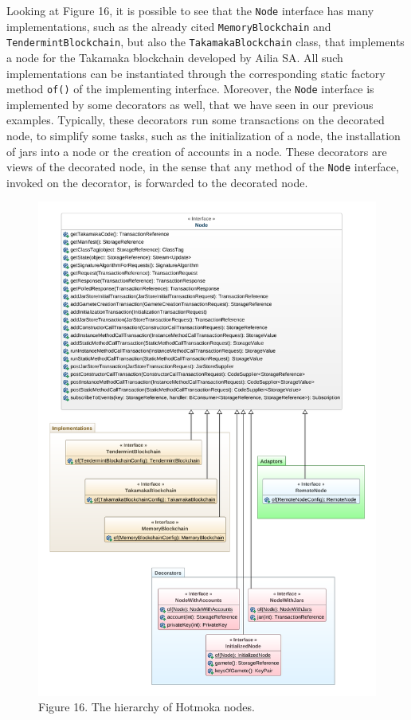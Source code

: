 \documentclass[a4paper,]{book}
\begin{document}
{Looking at Figure 16, it is possible to see that the \texttt{Node}
interface has many implementations, such as the already cited
\texttt{MemoryBlockchain} and \texttt{TendermintBlockchain}, but also
the \texttt{TakamakaBlockchain} class, that implements a node for the
Takamaka blockchain developed by Ailia SA. All such implementations can
be instantiated through the corresponding static factory method
\texttt{of()} of the implementing interface. Moreover, the \texttt{Node}
interface is implemented by some decorators as well, that we have seen
in our previous examples. Typically, these decorators run some
transactions on the decorated node, to simplify some tasks, such as the
initialization of a node, the installation of jars into a node or the
creation of accounts in a node. These decorators are views of the
decorated node, in the sense that any method of the \texttt{Node}
interface, invoked on the decorator, is forwarded to the decorated node.

\begin{figure}
\centering
\includegraphics[width=1\textwidth,height=\textheight]{pics/nodes.png}
\caption{Figure 16. The hierarchy of Hotmoka nodes.}
\end{figure}

}
\end{document}
